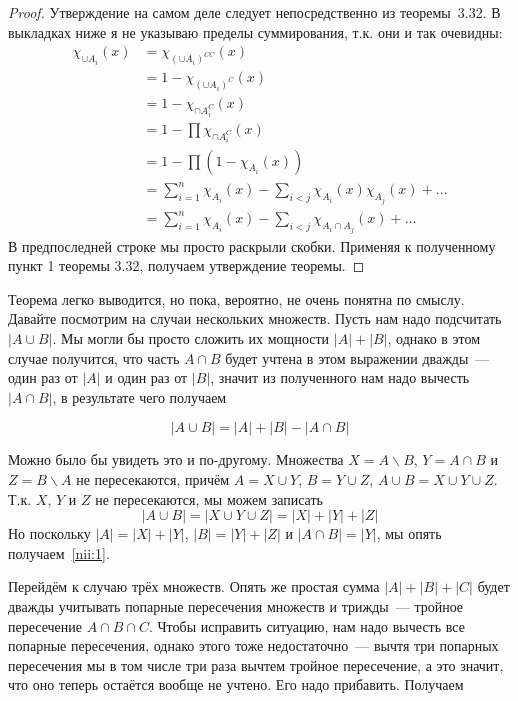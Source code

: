 \begin{proof}
Утверждение на самом деле следует непосредственно из теоремы~3.32. В выкладках ниже я не указываю пределы суммирования, т.к. они и так очевидны:
\begin{align*}
\chi_{\cup A_i}(x) &= \chi_{(\cup A_i)^{CC}}(x) \\
&= 1 -  \chi_{(\cup A_i)^C}(x) \\
&= 1 - \chi_{\cap A_i^C}(x) \\
&= 1 - \prod \chi_{\cap A_i^C}(x) \\
&= 1 - \prod (1 - \chi_{A_i}(x)) \\
&= \sum_{i=1}^n\chi_{A_i}(x) - \sum_{i<j}\chi_{A_i}(x)\chi_{A_j}(x) +\ldots\\
&= \sum_{i=1}^n\chi_{A_i}(x) - \sum_{i<j}\chi_{A_i\cap A_j}(x) +\ldots
\end{align*}
В предпоследней строке мы просто раскрыли скобки. Применяя к полученному пункт 1 теоремы 3.32, получаем утверждение теоремы.
\end{proof}

Теорема легко выводится, но пока, вероятно, не очень понятна по смыслу. Давайте посмотрим на случаи нескольких множеств. Пусть нам надо подсчитать $|A\cup B|$. Мы могли бы просто сложить их мощности $|A| + |B|$, однако в этом случае получится, что часть $A\cap B$ будет учтена в этом выражении дважды~— один раз от $|A|$ и  один раз от $|B|$, значит из полученного нам надо вычесть $|A\cap B|$, в результате чего получаем

\begin{equation}\label{nii:1}
|A\cup B| = |A| + |B| - |A\cap B|
\end{equation}

Можно было бы увидеть это и по-другому. Множества $X = A\backslash B$, $Y = A\cap B$ и $Z = B\backslash A$ не пересекаются, причём $A = X\cup Y$, $B = Y\cup Z$, $A\cup B = X\cup Y \cup Z$. Т.к. $X$, $Y$ и $Z$ не пересекаются, мы можем записать
$$|A\cup B| = |X\cup Y\cup Z| = |X| + |Y| + |Z|$$
Но поскольку $|A| = |X| + |Y|$, $|B| = |Y| + |Z|$ и $|A\cap B| = |Y|$, мы опять получаем~\eqref{nii:1}.

Перейдём к случаю трёх множеств. Опять же простая сумма $|A|+|B|+|C|$ будет дважды учитывать попарные пересечения множеств и трижды~— тройное пересечение $A\cap B\cap C$. Чтобы исправить ситуацию, нам надо вычесть все попарные пересечения, однако этого тоже недостаточно~— вычтя три попарных пересечения мы в том числе три раза вычтем тройное пересечение, а это значит, что оно теперь остаётся вообще не учтено. Его надо прибавить. Получаем

